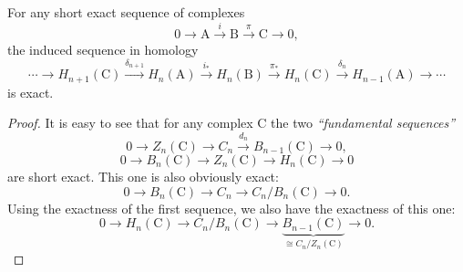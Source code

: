 \documentclass[english,letterpaper]{article}%
\numberwithin{equation}{section}
\numberwithin{figure}{section}
\numberwithin{table}{section}
\theoremstyle{definition}
\theoremstyle{definition}
\theoremstyle{definition}
\theoremstyle{plain}
\theoremstyle{plain}
\theoremstyle{plain}
\theoremstyle{plain}
\theoremstyle{remark}
\theoremstyle{remark}
\newcommand{\bm}[1]{\boldsymbol{\mathrm{#1}}}
\begin{document}
\begin{thm}\label{thm long exact seq in homology}
    For any short exact sequence of complexes 
    \[0\to \bm{A}\overset i\to \bm{B}\overset\pi\to \bm{C}\to 0 ,\]
    the induced sequence in homology
    \[\cdots \to H_{n+1}(\bm{C})\overset{\delta_{n+1}}\to H_n(\bm{A})\overset{i_\ast}\to H_n(\bm{B})\overset{\pi_\ast}\to H_n(\bm{C})\overset{\delta_n}\to H_{n-1}(\bm{A})\to \cdots \]
    is exact.
\end{thm}
\begin{proof}
    It is easy to see that for any complex $\bm{C}$ the two \emph{``fundamental sequences''}
    \[0\to Z_n(\bm{C})\to C_n\overset{d_n}\to B_{n-1}(\bm{C})\to 0,\]
    \[0\to B_n(\bm{C})\to Z_n(\bm{C})\to H_n(\bm{C})\to 0\]
    are short exact.
    This one is also obviously exact:
    \[0\to B_n(\bm{C})\to C_n\to C_n/B_n(\bm{C})\to 0.\]
    Using the exactness of the first sequence, we also have the exactness of this one:
    \[0\to H_n(\bm{C})\to C_n/B_n(\bm{C})\to \underbrace{B_{n-1}(\bm{C})}_{\cong C_n/Z_n(\bm{C})}\to 0.\]
    

\end{proof}
\end{document}
